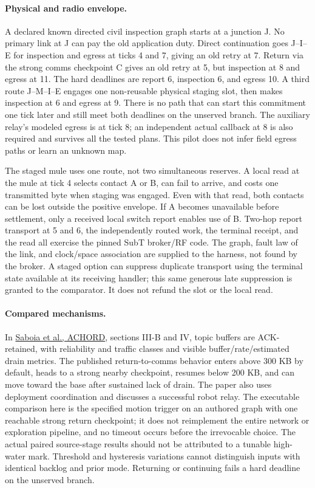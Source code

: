 \documentclass[11pt]{article}
\begin{document}
\paragraph{Physical and radio envelope.}
A declared known directed civil inspection graph starts at a
junction J. No primary link at J can pay the old application
duty. Direct continuation goes J--I--E for inspection and egress
at ticks 4 and 7, giving an old retry at 7. Return via the strong
comms checkpoint C gives an old retry at 5, but inspection at
8 and egress at 11. The hard deadlines are report 6, inspection
6, and egress 10. A third route J--M--I--E engages one
non-reusable physical staging slot, then makes inspection at 6
and egress at 9. There is no path that can start this commitment
one tick later and still meet both deadlines on the unserved
branch. The auxiliary relay's modeled egress is at tick 8;
an independent actual callback at 8 is also required and survives
all the tested plans. This pilot does not infer field egress
paths or learn an unknown map.

The staged mule uses one route, not two simultaneous reserves.
A local read at the mule at tick 4 selects contact A or B, can
fail to arrive, and costs one transmitted byte when staging
was engaged. Even with that read, both contacts can be lost
outside the positive envelope. If A becomes unavailable before
settlement, only a received local switch report enables use of
B. Two-hop report transport at 5 and 6, the independently routed
work, the terminal receipt, and the read all exercise the pinned
SubT broker/RF code. The graph, fault law of the link, and
clock/space association are supplied to the harness, not found
by the broker. A staged option can suppress duplicate transport
using the terminal state available at its receiving handler;
this same generous late suppression is granted to the comparator.
It does not refund the slot or the local read.

\paragraph{Compared mechanisms.}
In \href{https://lillyclark.github.io/files/ACHORD_RA_L_IROS_.pdf}{Saboia et al.,
ACHORD}, sections III-B and IV, topic buffers are ACK-retained,
with reliability and traffic classes and visible buffer/rate/estimated
drain metrics. The published return-to-comms behavior enters above
300 KB by default, heads to a strong nearby checkpoint, resumes
below 200 KB, and can move toward the base after sustained lack
of drain. The paper also uses deployment coordination and discusses
a successful robot relay. The executable comparison here is the
specified motion trigger on an authored graph with one reachable
strong return checkpoint; it does not reimplement the entire
network or exploration pipeline, and no timeout occurs before the
irrevocable choice. The actual paired source-stage results should
not be attributed to a tunable high-water mark. Threshold and
hysteresis variations cannot distinguish inputs with identical
backlog and prior mode. Returning or continuing fails a hard
deadline on the unserved branch.
\end{document}
